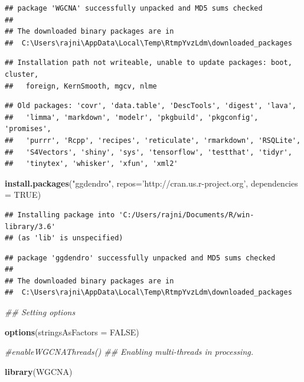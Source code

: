 \documentclass[]{article}
\newenvironment{Shaded}{\begin{snugshade}}{\end{snugshade}}
\newcommand{\CommentTok}[1]{\textcolor[rgb]{0.56,0.35,0.01}{\textit{#1}}}
\newcommand{\DataTypeTok}[1]{\textcolor[rgb]{0.13,0.29,0.53}{#1}}
\newcommand{\KeywordTok}[1]{\textcolor[rgb]{0.13,0.29,0.53}{\textbf{#1}}}
\newcommand{\NormalTok}[1]{#1}
\newcommand{\OtherTok}[1]{\textcolor[rgb]{0.56,0.35,0.01}{#1}}
\newcommand{\StringTok}[1]{\textcolor[rgb]{0.31,0.60,0.02}{#1}}
\begin{document}
\begin{verbatim}
## package 'WGCNA' successfully unpacked and MD5 sums checked
## 
## The downloaded binary packages are in
##  C:\Users\rajni\AppData\Local\Temp\RtmpYvzLdm\downloaded_packages
\end{verbatim}

\begin{verbatim}
## Installation path not writeable, unable to update packages: boot, cluster,
##   foreign, KernSmooth, mgcv, nlme
\end{verbatim}

\begin{verbatim}
## Old packages: 'covr', 'data.table', 'DescTools', 'digest', 'lava',
##   'limma', 'markdown', 'modelr', 'pkgbuild', 'pkgconfig', 'promises',
##   'purrr', 'Rcpp', 'recipes', 'reticulate', 'rmarkdown', 'RSQLite',
##   'S4Vectors', 'shiny', 'sys', 'tensorflow', 'testthat', 'tidyr',
##   'tinytex', 'whisker', 'xfun', 'xml2'
\end{verbatim}

\begin{Shaded}
\begin{Highlighting}[]
\KeywordTok{install.packages}\NormalTok{(}\StringTok{"ggdendro"}\NormalTok{, }
                 \DataTypeTok{repos=}\StringTok{'http://cran.us.r-project.org'}\NormalTok{,}
                 \DataTypeTok{dependencies =} \OtherTok{TRUE}\NormalTok{)}
\end{Highlighting}
\end{Shaded}

\begin{verbatim}
## Installing package into 'C:/Users/rajni/Documents/R/win-library/3.6'
## (as 'lib' is unspecified)
\end{verbatim}

\begin{verbatim}
## package 'ggdendro' successfully unpacked and MD5 sums checked
## 
## The downloaded binary packages are in
##  C:\Users\rajni\AppData\Local\Temp\RtmpYvzLdm\downloaded_packages
\end{verbatim}

\begin{Shaded}
\begin{Highlighting}[]
\CommentTok{## Setting options}

\KeywordTok{options}\NormalTok{(}\DataTypeTok{stringsAsFactors =} \OtherTok{FALSE}\NormalTok{)}

\CommentTok{#enableWGCNAThreads() ## Enabling multi-threads in processing.}

\KeywordTok{library}\NormalTok{(WGCNA)}
\end{Highlighting}
\end{Shaded}
\end{document}
